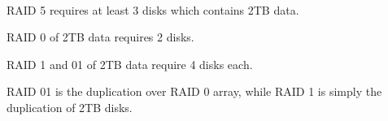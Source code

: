 \documentclass[a4paper, 12pt, addpoints, answers]{exam}
\begin{document}
\begin{questions}
\begin{solution}
{ } \\
RAID 5 requires at least 3 disks which contains 2TB data. \\
\raggedright RAID 0 of 2TB data requires 2 disks. \\
\raggedright RAID 1 and 01 of 2TB data require 4 disks each. \\
\raggedright RAID 01 is the duplication over RAID 0 array, while RAID 1 is simply the duplication of 2TB disks.
\end{solution}



\end{questions}
\end{document}
